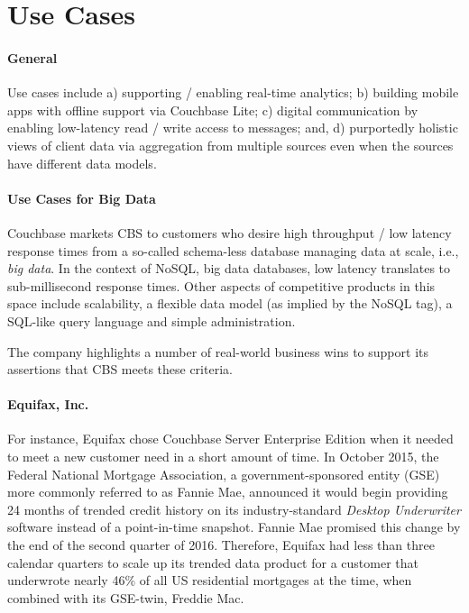 \documentclass[9pt,twocolumn,twoside]{styles/osajnl}
\begin{document}
\section{Use Cases}
\paragraph{General}
Use cases include a) supporting / enabling real-time analytics; b) building mobile apps with offline support via Couchbase Lite; c) digital communication by enabling low-latency read / write access to messages; and, d) purportedly holistic views of client data via aggregation from multiple sources even when the sources have different data models.

\paragraph{Use Cases for Big Data} Couchbase markets CBS to customers who
desire high throughput / low latency response times from a so-called schema-less
database managing data at scale, i.e., \textit{big data}. In the context of
NoSQL, big data databases, low latency translates to sub-millisecond response
times.  Other aspects of competitive products in this space include scalability,
a flexible data model (as implied by the NoSQL tag), a SQL-like query language
and simple administration.\cite{www-cbsintro-cbsinc}

The company highlights a number of real-world business wins to support its
assertions that CBS meets these criteria.

\paragraph{Equifax, Inc.}
For instance, Equifax chose Couchbase
Server Enterprise Edition when it needed to meet a new customer need in a short
amount of time.  In October 2015, the Federal National Mortgage Association, a
government-sponsored entity (GSE) more commonly referred to as Fannie Mae,
announced it would begin providing 24 months of trended credit history on its
industry-standard \textit{Desktop Underwriter} software instead of a point-in-time snapshot.  Fannie Mae promised this change by the end of the second quarter of 2016.  Therefore, Equifax had less than three calendar quarters to scale up its trended data product for a customer that underwrote nearly 46\% of all US residential mortgages at the time, when combined with its GSE-twin, Freddie Mac.
\cite{www-trendeddata-equifax,www-gsemktshare-valuewalk}
\end{document}
